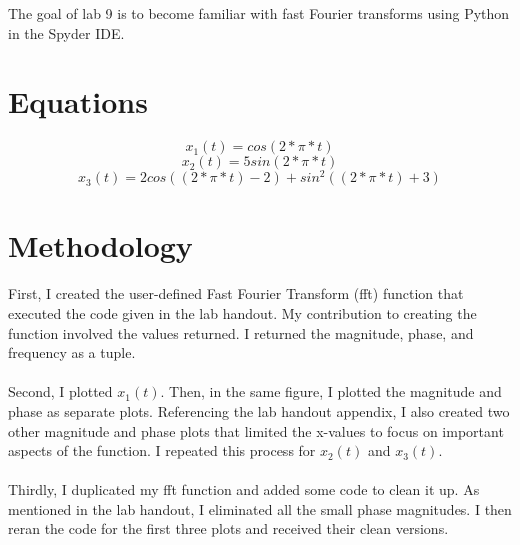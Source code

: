 \documentclass[12pt]{report}
\begin{document}
The goal of lab 9 is to become familiar with fast Fourier transforms using Python in the Spyder IDE.

\section{Equations}
    \begin{equation}
       x_1(t) = cos(2*\pi*t) 
    \end{equation}
    \begin{equation}
       x_2(t) = 5sin(2*\pi*t) 
    \end{equation}
    \begin{equation}
       x_3(t) = 2cos((2*\pi*t) -2) + sin^2((2*\pi*t)+3)
    \end{equation}
    
\section{Methodology}


    \paragraph{} First, I created the user-defined Fast Fourier Transform (fft) function that executed the code given in the lab handout. My contribution to creating the function involved the values returned. I returned the magnitude, phase, and frequency as a tuple. 
    \paragraph{} Second, I plotted $x_1(t)$. Then, in the same figure, I plotted the magnitude and phase as separate plots. Referencing the lab handout appendix, I also created two other magnitude and phase plots that limited the x-values to focus on important aspects of the function. I repeated this process for $x_2(t)$ and $x_3(t)$. 
    \paragraph{} Thirdly, I duplicated my fft function and added some code to clean it up. As mentioned in the lab handout, I eliminated all the small phase magnitudes. I then reran the code for the first three plots and received their clean versions. 
\end{document}
